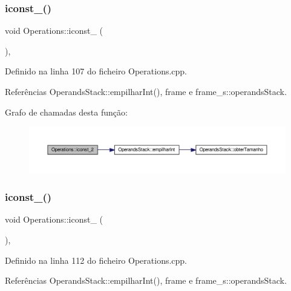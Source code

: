 \subsubsection{\texorpdfstring{iconst\+\_()}{iconst\_2()}}
{\footnotesize\ttfamily void Operations\+::iconst\+\_ (\begin{DoxyParamCaption}{ }\end{DoxyParamCaption})\hspace{0.3cm}{\ttfamily [static]}, {\ttfamily [private]}}



Definido na linha 107 do ficheiro Operations.\+cpp.



Referências Operands\+Stack\+::empilhar\+Int(), frame e frame\+\_\+s\+::operands\+Stack.

Grafo de chamadas desta função\+:\nopagebreak
\begin{figure}[H]
\begin{center}
\leavevmode
\includegraphics[width=350pt]{classOperations_af1a4f99f0d99da0a7db7fc926932a3c8_cgraph}
\end{center}
\end{figure}
\mbox{\label{classOperations_ab8466864c000152e75172b623704f610}} 
\subsubsection{\texorpdfstring{iconst\+\_()}{iconst\_3()}}
{\footnotesize\ttfamily void Operations\+::iconst\+\_ (\begin{DoxyParamCaption}{ }\end{DoxyParamCaption})\hspace{0.3cm}{\ttfamily [static]}, {\ttfamily [private]}}



Definido na linha 112 do ficheiro Operations.\+cpp.



Referências Operands\+Stack\+::empilhar\+Int(), frame e frame\+\_\+s\+::operands\+Stack.

